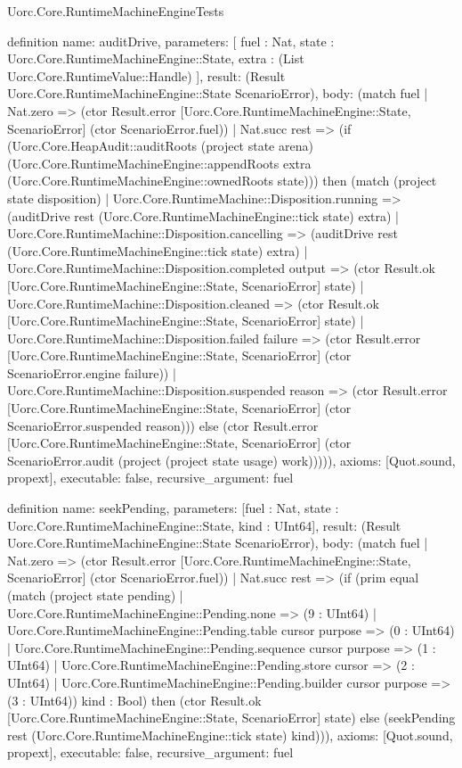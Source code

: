 \begin{lexlean}{Uorc.Core.RuntimeMachineEngineTests}
\begin{semanticmodule}
definition{
  name: auditDrive,
  parameters: [
    fuel : Nat,
    state : Uorc.Core.RuntimeMachineEngine::State,
    extra : (List Uorc.Core.RuntimeValue::Handle)
  ],
  result: (Result Uorc.Core.RuntimeMachineEngine::State ScenarioError),
  body: (match fuel
    | Nat.zero => (ctor Result.error [Uorc.Core.RuntimeMachineEngine::State, ScenarioError] (ctor ScenarioError.fuel))
    | Nat.succ rest => (if (Uorc.Core.HeapAudit::auditRoots (project state arena) (Uorc.Core.RuntimeMachineEngine::appendRoots extra (Uorc.Core.RuntimeMachineEngine::ownedRoots state))) then (match (project state disposition)
      | Uorc.Core.RuntimeMachine::Disposition.running => (auditDrive rest (Uorc.Core.RuntimeMachineEngine::tick state) extra)
      | Uorc.Core.RuntimeMachine::Disposition.cancelling => (auditDrive rest (Uorc.Core.RuntimeMachineEngine::tick state) extra)
      | Uorc.Core.RuntimeMachine::Disposition.completed output => (ctor Result.ok [Uorc.Core.RuntimeMachineEngine::State, ScenarioError] state)
      | Uorc.Core.RuntimeMachine::Disposition.cleaned => (ctor Result.ok [Uorc.Core.RuntimeMachineEngine::State, ScenarioError] state)
      | Uorc.Core.RuntimeMachine::Disposition.failed failure => (ctor Result.error [Uorc.Core.RuntimeMachineEngine::State, ScenarioError] (ctor ScenarioError.engine failure))
      | Uorc.Core.RuntimeMachine::Disposition.suspended reason => (ctor Result.error [Uorc.Core.RuntimeMachineEngine::State, ScenarioError] (ctor ScenarioError.suspended reason))) else (ctor Result.error [Uorc.Core.RuntimeMachineEngine::State, ScenarioError] (ctor ScenarioError.audit (project (project state usage) work))))),
  axioms: [Quot.sound, propext],
  executable: false,
  recursive_argument: fuel
}

definition{
  name: seekPending,
  parameters: [fuel : Nat, state : Uorc.Core.RuntimeMachineEngine::State, kind : UInt64],
  result: (Result Uorc.Core.RuntimeMachineEngine::State ScenarioError),
  body: (match fuel
    | Nat.zero => (ctor Result.error [Uorc.Core.RuntimeMachineEngine::State, ScenarioError] (ctor ScenarioError.fuel))
    | Nat.succ rest => (if (prim equal (match (project state pending)
      | Uorc.Core.RuntimeMachineEngine::Pending.none => (9 : UInt64)
      | Uorc.Core.RuntimeMachineEngine::Pending.table cursor purpose => (0 : UInt64)
      | Uorc.Core.RuntimeMachineEngine::Pending.sequence cursor purpose => (1 : UInt64)
      | Uorc.Core.RuntimeMachineEngine::Pending.store cursor => (2 : UInt64)
      | Uorc.Core.RuntimeMachineEngine::Pending.builder cursor purpose => (3 : UInt64)) kind : Bool) then (ctor Result.ok [Uorc.Core.RuntimeMachineEngine::State, ScenarioError] state) else (seekPending rest (Uorc.Core.RuntimeMachineEngine::tick state) kind))),
  axioms: [Quot.sound, propext],
  executable: false,
  recursive_argument: fuel
}


\end{semanticmodule}
\end{lexlean}
